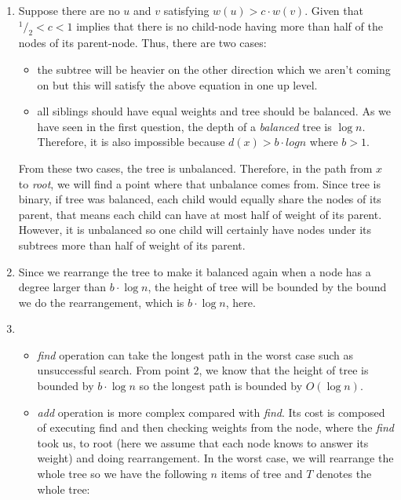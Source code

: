 \begin{enumerate}
  \item
     Suppose there are no $u$ and $v$ satisfying $w(u) > c \cdot w(v)$. Given that $^1/_2 < c < 1$ implies that there is no child-node having more than half of the nodes of its parent-node. Thus, there are two cases: 
    \begin{itemize}
      \item 
      the subtree will be heavier on the other direction which we aren't coming on but this will satisfy the above equation in one up level.
      
      \item 
      all siblings should have equal weights and tree should be  balanced. As we have seen in the first question, the depth of a \textit{balanced} tree is $\log n$. Therefore, it is also impossible because $d(x) > b \cdot log n$ where $b > 1$.
    \end{itemize}        

    From these two cases, the tree is unbalanced. Therefore, in the path from $x$ to \textit{root}, we will find a point where that unbalance comes from. Since tree is binary, if tree was balanced, each child would equally share the nodes of its parent, that means each child can have at most half of weight of its parent. However, it is unbalanced so one child will certainly have nodes under its subtrees more than half of weight of its parent.
    
  \item
   Since we rearrange the tree to make it balanced again when a node has a degree larger than $b \cdot \log n$, the height of tree will be bounded by the bound we do the rearrangement, which is $b \cdot \log n$, here.
  
  \item
  \begin{itemize}
    \item \textit{find} operation can take the longest path in the worst case such as unsuccessful search. From point $2$, we know that the height of tree is bounded by $b \cdot \log n$ so the longest path is bounded by $O(\log n)$.
    
    \item \textit{add} operation is more complex compared with \textit{find}. Its cost is composed of executing find and then checking weights from the node, where the \textit{find} took us, to root (here we assume that each node knows to answer its weight) and doing rearrangement. In the worst case, we will rearrange the whole tree so we have the following $n$ items of tree and $T$ denotes the whole tree:
    

\end{itemize}
\end{enumerate}
